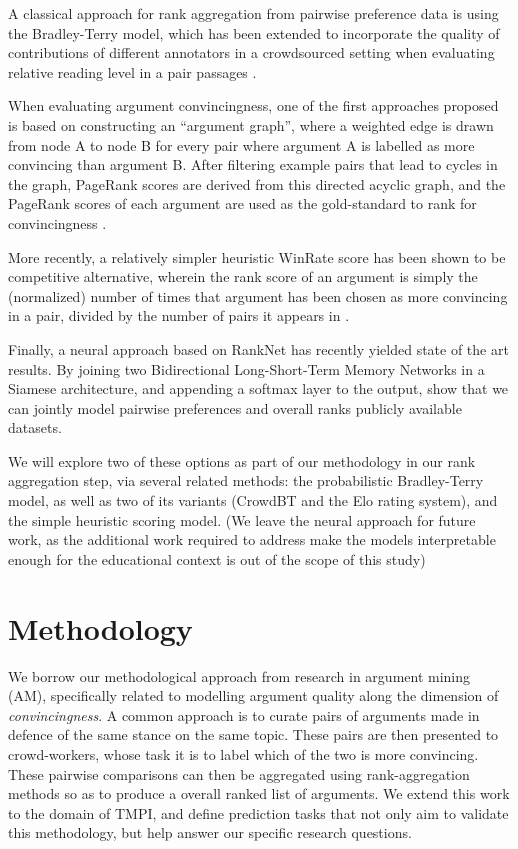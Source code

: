 \documentclass[acmsmall]{acmart}
\begin{document}
A classical approach for rank aggregation from pairwise preference data is 
using the Bradley-Terry model, which has been extended to incorporate the 
quality of contributions of different annotators in a crowdsourced setting when 
evaluating relative reading level in a pair passages \cite{chen_pairwise_2013}. 

When evaluating argument convincingness, one of the first approaches proposed 
is based on constructing an ``argument graph'', where a weighted edge is drawn 
from node A to node B for every pair where argument A is labelled as more 
convincing than argument B. 
After filtering example pairs that lead to cycles in the graph, PageRank scores 
are derived from this directed acyclic graph, and the PageRank 
scores of each argument are used as the gold-standard to rank for 
convincingness \cite{habernal_which_2016}.

More recently, a relatively simpler heuristic WinRate score has been shown to 
be competitive alternative, wherein the rank score of an argument is simply the 
(normalized) number of times that argument has been chosen as more convincing 
in a pair, divided by the number of pairs it appears in
\cite{potash_ranking_2019}.

Finally, a neural approach based on RankNet has recently yielded state of the 
art results. By joining two Bidirectional Long-Short-Term Memory Networks in a 
Siamese architecture, and appending a softmax layer to the output, 
\cite{gleize_are_2019} show that we can jointly model pairwise preferences and 
overall ranks publicly available datasets.

We will explore two of these options as part of our methodology in our rank 
aggregation step, via several related methods: 
the probabilistic Bradley-Terry model, as well as two of its variants (CrowdBT 
and the Elo rating system), and the simple heuristic scoring model. 
(We leave the neural approach for future work, as the additional work required 
to address make the models interpretable enough for the educational context is 
out of the scope of this study)


\section{Methodology}

We borrow our methodological approach from research in argument mining (AM), 
specifically related to modelling argument quality along the dimension of 
\textit{convincingness}.
A common approach is to curate pairs of arguments made in defence of the same 
stance on the same topic.
These pairs are then presented to crowd-workers, whose task it is to label 
which of the two is more convincing. 
These pairwise comparisons can then be aggregated using rank-aggregation 
methods so as to produce a overall ranked list of arguments.
We extend this work to the domain of TMPI, and define prediction tasks that not 
only aim to validate this methodology, but help answer our specific research 
questions.
\end{document}
